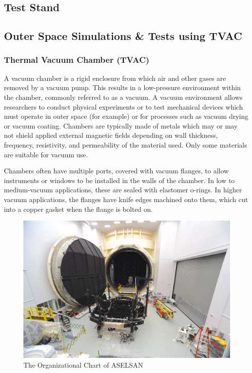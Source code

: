 \subsection{Test Stand}
\- \vfill
\subsection{Outer Space Simulations \& Tests using TVAC  }

\subsubsection{Thermal Vacuum Chamber (TVAC) }

	A vacuum chamber is a rigid enclosure from which air and other gases are removed by a vacuum pump. This results in a low-pressure environment within the chamber, commonly referred to as a vacuum. A vacuum environment allows researchers to conduct physical experiments or to test mechanical devices which must operate in outer space (for example) or for processes such as vacuum drying or vacuum coating. Chambers are typically made of metals which may or may not shield applied external magnetic fields depending on wall thickness, frequency, resistivity, and permeability of the material used. Only some materials are suitable for vacuum use.

Chambers often have multiple ports, covered with vacuum flanges, to allow instruments or windows to be installed in the walls of the chamber. In low to medium-vacuum applications, these are sealed with elastomer o-rings. In higher vacuum applications, the flanges have knife edges machined onto them, which cut into a copper gasket when the flange is bolted on.

\begin{figure}[H]
	\center
	\setlength{\unitlength}{\textwidth} 
	\includegraphics[width=1.0\unitlength]{tvac}
	\caption{\label{fig:tvac}The Organizational Chart of ASELSAN }
\end{figure}

